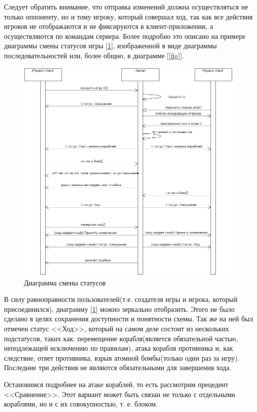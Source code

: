  Следует обратить внимание, что отправка изменений должна осуществляться не только оппоненту, но и тому игроку, который совершал ход, так как все действия игроков не отображаются и не фиксируются в клиент-приложении, а осуществляются по командам сервера. Более подробно это описано на примере диаграммы смены статусов игры [\ref{fig17}], изображенной в виде диаграммы последовательностей или, более общно, в диаграмме [\ref{fig}].

\begin{figure}[htp]
\centering
\includegraphics[width=18cm]{images/srvstate.png}
\caption{Диаграмма смены статусов}
\label{fig17}
\end{figure}

В силу равноправности пользователей(т.е. создателя игры и игрока, который присоединился), диаграмму [\ref{fig17}] можно зеркально отобразить. Этого не было сделано в целях сохранения доступности и понятности схемы. Так же на ней был отмечен статус <<Ход>>, который на самом деле состоит из нескольких подстатусов, таких как: перемещение корабля(является обязательной частью, неподлежащей исключению по правилам), атака корабля противника и, как следствие, ответ противника, взрыв атомной бомбы(только один раз за игру). Последние три действия не являются обязательными для завершения хода. 

Остановимся подробнее на атаке кораблей, то есть рассмотрим прецедент <<Сравнение>>. Этот вариант может быть связан не только с отдельными кораблями, но и с их совокупностью, т. е. блоком.

